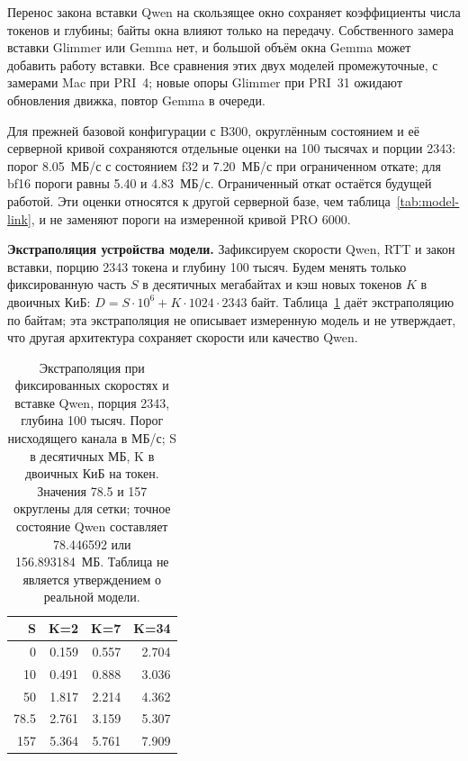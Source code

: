 Перенос закона вставки Qwen на скользящее окно сохраняет коэффициенты числа токенов и глубины;
байты окна влияют только на передачу. Собственного замера вставки Glimmer или Gemma нет,
и большой объём окна Gemma может добавить работу вставки. Все сравнения этих двух моделей промежуточные,
с замерами Mac при PRI~4; новые опоры Glimmer при PRI~31 ожидают обновления движка, повтор Gemma в очереди.

Для прежней базовой конфигурации с B300, округлённым состоянием и её серверной кривой
сохраняются отдельные оценки на 100 тысячах и порции 2343: порог 8.05~МБ/с с состоянием f32
и 7.20~МБ/с при ограниченном откате; для bf16 пороги равны 5.40 и 4.83~МБ/с.
Ограниченный откат остаётся будущей работой. Эти оценки относятся к другой серверной базе,
чем таблица~\ref{tab:model-link}, и не заменяют пороги на измеренной кривой PRO 6000.

\textbf{Экстраполяция устройства модели.} Зафиксируем скорости Qwen, RTT и закон вставки,
порцию 2343 токена и глубину 100 тысяч. Будем менять только фиксированную часть $S$ в десятичных мегабайтах
и кэш новых токенов $K$ в двоичных КиБ: $D=S\cdot10^6+K\cdot1024\cdot2343$ байт.
Таблица~\ref{tab:architecture-extrapolation} даёт экстраполяцию по байтам;
эта экстраполяция не описывает измеренную модель и не утверждает, что другая архитектура сохраняет скорости или качество Qwen.

\begin{table}[t]
\centering
\caption{Экстраполяция при фиксированных скоростях и вставке Qwen, порция 2343, глубина 100 тысяч.
Порог нисходящего канала в МБ/с; S в десятичных МБ, K в двоичных КиБ на токен.
Значения 78.5 и 157 округлены для сетки; точное состояние Qwen составляет 78.446592 или 156.893184~МБ.
Таблица не является утверждением о реальной модели.}
\label{tab:architecture-extrapolation}
\footnotesize
\begin{tabular}{rrrr}
\toprule
S & K=2 & K=7 & K=34 \\
\midrule
0 & 0.159 & 0.557 & 2.704 \\
10 & 0.491 & 0.888 & 3.036 \\
50 & 1.817 & 2.214 & 4.362 \\
78.5 & 2.761 & 3.159 & 5.307 \\
157 & 5.364 & 5.761 & 7.909 \\
\bottomrule
\end{tabular}
\end{table}

